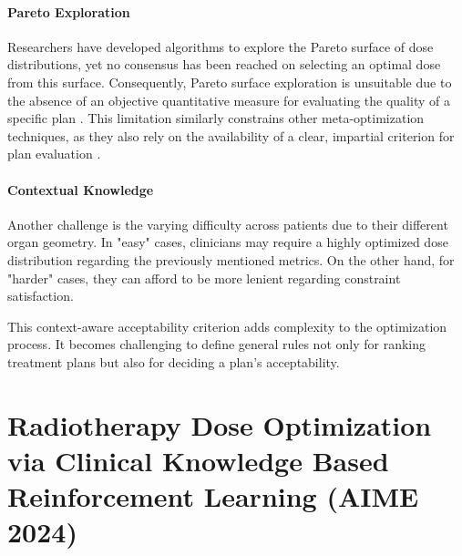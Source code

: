 \paragraph{Pareto Exploration}
Researchers have developed algorithms to explore the Pareto surface of dose distributions, yet no consensus has been reached on selecting an optimal dose from this surface.
Consequently, Pareto surface exploration is unsuitable due to the absence of an objective quantitative measure for evaluating the quality of a specific plan \cite{huang_pareto_2021}.
This limitation similarly constrains other meta-optimization techniques, as they also rely on the availability of a clear, impartial criterion for plan evaluation \cite{wu_optimization_2001, xing_optimization_1999}.

\paragraph{Contextual Knowledge}
Another challenge is the varying difficulty across patients due to their different organ geometry.
In "easy" cases, clinicians may require a highly optimized dose distribution regarding the previously mentioned metrics.
On the other hand, for "harder" cases, they can afford to be more lenient regarding constraint satisfaction.

This context-aware acceptability criterion adds complexity to the optimization process.
It becomes challenging to define general rules not only for ranking treatment plans but also for deciding a plan's acceptability.






\section{Radiotherapy Dose Optimization via Clinical Knowledge Based Reinforcement Learning (AIME 2024)}

